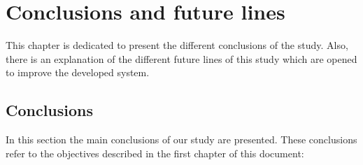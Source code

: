 
\chapter{Conclusions and future lines}
\newpage

This chapter is dedicated to present the different conclusions of the study. Also, there is an explanation of the different future lines of this study which are opened to improve the developed system.

\section{Conclusions}

In this section the main conclusions of our study are presented. These conclusions refer to the objectives described in the first chapter of this document:

